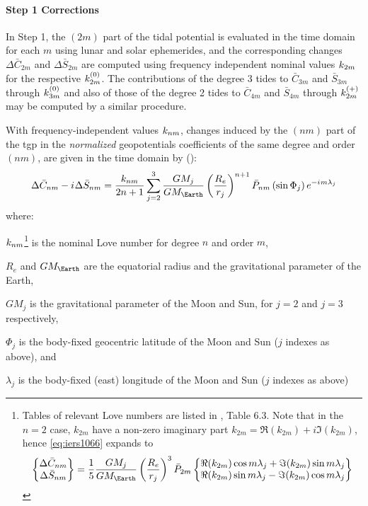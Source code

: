 \paragraph{Step 1 Corrections}\label{par:step1-corr-earth-tides}
In Step 1, the $(2m)$ part of the tidal potential is evaluated in the 
time domain for each $m$ using lunar and solar ephemerides, and the 
corresponding changes $\Delta \bar{C}_{2m}$ and $\Delta \bar{S}_{2m}$ are 
computed using frequency independent nominal values $k _{2m}$ for the 
respective $k ^{(0)}_{2m}$. The contributions of the degree 3 tides to
$\bar{C}_{3m}$ and $\bar{S}_{3m}$ through $k ^{(0)}_{3m}$ and also of 
those of the degree 2 tides to $\bar{C}_{4m}$ and $\bar{S}_{4m}$ through 
$k ^{(+)}_{2m}$ may be computed by a similar procedure.

With frequency-independent values $k _{nm}$, changes induced by the 
$(nm)$ part of the \gls{tgp} in the \emph{normalized} geopotentials 
coefficients of the same degree and order $(nm)$, are given in the time 
domain by (\cite{iers2010}):
\begin{equation}
\Delta \bar{C}_{nm} - \iim \Delta \bar{S}_{nm} = \frac{\lovek _{nm}}{2n+1}
  \sum^{3}_{j=2} \frac{GM_j}{GM_\Earth} \left( \frac{R_e}{r_j} \right) ^{n+1} 
  \bar{P}_{nm} \left( \sin \Phi _j \right) e^{-\iim m \lambda _j}
  \label{eq:iers1066}
\end{equation}
where:
\begin{description}
  \item $k _{nm}$\footnote{Tables of relevant Love numbers are listed 
    in \cite{iers2010}, Table 6.3. Note that in the $n=2$ case, $k_{2m}$ have a 
    non-zero imaginary part $k_{2m} = \Re(k_{2m}) + i\Im(k_{2m})$, hence 
    \autoref{eq:iers1066} expands to
    \begin{equation}
      \begin{Bmatrix} \Delta \bar{C}_{nm} \\ \Delta \bar{S}_{nm} \end{Bmatrix}
      = \frac{1}{5} \frac{GM_j}{GM_\Earth} \left( \frac{R_e}{r_j} \right) ^{3} \bar{P}_{2m} 
      \begin{Bmatrix}
        \Re(k_{2m}) \cos{m\lambda _j} + \Im(k_{2m}) \sin{m\lambda _j} \\
        \Re(k_{2m}) \sin{m\lambda _j} - \Im(k_{2m}) \cos{m\lambda _j}
      \end{Bmatrix}
    \end{equation}
    } is the nominal Love number for degree 
    $n$ and order $m$, 
  \item $R_e$ and $GM_{\Earth}$ are the equatorial radius and the 
    gravitational parameter of the Earth,
  \item $GM_j$ is the gravitational parameter of the Moon and Sun, for 
    $j=2$ and $j=3$ respectively,
  \item $\Phi _j$ is the body-fixed geocentric latitude of the Moon and 
    Sun ($j$ indexes as above), and
  \item $\lambda _j$ is the body-fixed (east) longitude of the Moon and 
    Sun ($j$ indexes as above)
\end{description}

